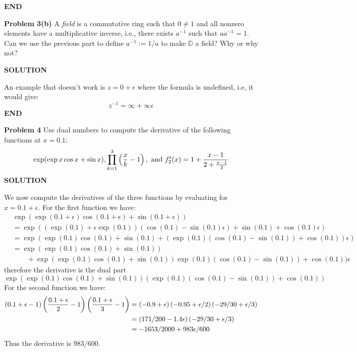 \documentclass[12pt,a4paper]{article}
\def\bbD{ {\mathbb D} }
\begin{document}
\textbf{END}

\textbf{Problem 3(b)} A \emph{field} is a commutative ring such that $0 \ensuremath{\neq} 1$ and all nonzero elements have a multiplicative inverse, i.e., there exists $a^{-1}$ such that $a a^{-1} = 1$. Can we use the previous part to define $a^{-1} := 1/a$ to make $\ensuremath{\bbD}$ a field? Why or why not?

\textbf{SOLUTION}

An example that doesn't work is $z = 0 + \ensuremath{\epsilon}$ where the formula is undefined, i.e, it would give:
\[
z^{-1} = \ensuremath{\infty} + \ensuremath{\infty}\ensuremath{\epsilon}
\]
\textbf{END}

\textbf{Problem 4} Use dual numbers to compute the derivative of the following functions at $x = 0.1$:
\[
\exp(\exp x \cos x + \sin x), \prod_{k=1}^3 \left({x \over k}-1\right),\hbox{ and } f^{\rm s}_2(x) = {1 + {x - 1 \over 2 + {x-1 \over 2}}}
\]
\textbf{SOLUTION}

We now compute the derivatives of the three functions by evaluating for $x = 0.1 + \ensuremath{\epsilon}$. For the first function we have:
\begin{align*}
&\exp(\exp(0.1 + \ensuremath{\epsilon})\cos(0.1+\ensuremath{\epsilon}) + \sin(0.1+\ensuremath{\epsilon})) \\
&=\exp((\exp(0.1) + \ensuremath{\epsilon}\exp(0.1))(\cos(0.1)-\sin(0.1)\ensuremath{\epsilon}) + \sin(0.1)+\cos(0.1)\ensuremath{\epsilon}) \\
&= \exp(\exp(0.1)\cos(0.1)+ \sin(0.1) + (\exp(0.1)(\cos(0.1)-\sin(0.1))+\cos(0.1))\ensuremath{\epsilon}) \\
&= \exp(\exp(0.1)\cos(0.1)+ \sin(0.1))\\
&\qquad + \exp(\exp(0.1)\cos(0.1)+ \sin(0.1))\exp(0.1)(\cos(0.1)-\sin(0.1))+\cos(0.1))\ensuremath{\epsilon} 
\end{align*}
therefore the derivative is the dual part
\[
\exp(\exp(0.1)\cos(0.1)+ \sin(0.1))(\exp(0.1)(\cos(0.1)-\sin(0.1))+\cos(0.1))
\]
For the second function we have:
\begin{align*}
 \left(0.1+\ensuremath{\epsilon}-1\right) \left({0.1 + \ensuremath{\epsilon} \over 2}-1\right)\left({0.1 + \ensuremath{\epsilon} \over 3}-1\right)
 &=\left(-0.9+\ensuremath{\epsilon}\right) \left(-0.95 + \ensuremath{\epsilon}/2\right)\left(-29/30 + \ensuremath{\epsilon}/3\right) \\
&=\left(171/200 -1.4\ensuremath{\epsilon}\right)\left(-29/30 + \ensuremath{\epsilon}/3\right)  \\
&= -1653/2000 + 983\ensuremath{\epsilon}/600
\end{align*}
Thus the derivative is $983/600$.
\end{document}
